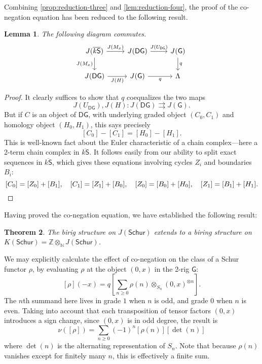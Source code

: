 \documentclass[12pt,reqno]{amsart}
\theoremstyle{plain}
\newtheorem{thm}{Theorem}
\newtheorem{lem}[thm]{Lemma}
\theoremstyle{definition}
\theoremstyle{remark}
\newcommand{\maps}{\colon}
\newcommand{\category}[1]{\mathsf{#1}}
\newcommand{\N}{\mathbb N}
\renewcommand{\S}{\category S}
\newcommand{\Z}{\mathbb Z}
\newcommand{\namedcat}[1]{\mathsf{#1}}
\newcommand{\Schur}{\namedcat{Schur}}
\newcommand{\G}{\mathsf{G}} %
\newcommand{\DG}{\mathsf{DG}} %
\newcommand{\ksbar}{\overline{k\S}}
\numberwithin{thm}{section}
\begin{document}
Combining \cref{prop:reduction-three} and \cref{lem:reduction-four}, the proof of the co-negation equation has been reduced to the following result.

\begin{lem}
    The following diagram commutes. 
    \[
    \begin{tikzcd}
        J(\ksbar) 
        \arrow[swap, d, "J(M_x)"] 
        \arrow[r, "J(M_x)"] 
        &
        J(\DG) 
        \arrow[r, "J(U_{\DG})"] 
        & 
        J(\G) 
        \arrow[d, "q"] 
        \\
        J(\DG) 
        \arrow[r, swap, "J(H)"] 
        & 
        J(\G) 
        \arrow[r, swap, "q"] 
        & 
        \Lambda
    \end{tikzcd}
    \]
\end{lem}

\begin{proof}
    It clearly suffices to show that $q$ coequalizes the two maps 
    \[
    J(U_{\DG}), J(H) \maps J(\DG) \rightrightarrows J(\G).
    \]
    But if $C$ is an object of $\DG$, with underlying graded object $(C_0, C_1)$ and homology object $(H_0, H_1)$, this says precisely
    \[
    [C_0] - [C_1] = [H_0] - [H_1].
    \]
    This is well-known fact about the Euler characteristic of a chain complex---here a 2-term chain complex in $\ksbar$. It follows easily from our ability to split exact sequences in $\ksbar$, which gives these equations involving cycles $Z_i$ and boundaries $B_i$: 
    \[
    [C_0] = [Z_0] + [B_1], \quad [C_1] = [Z_1] + [B_0], \quad [Z_0] = [B_0] + [H_0], \quad 
    [Z_1] = [B_1] + [H_1]. \qedhere
    \]
\end{proof}

Having proved the co-negation equation, we have established the following result: 

\begin{thm}
\label{thm:lambda_biring}
The birig structure on $J(\Schur)$ extends to a biring structure on $K(\Schur) = \Z \otimes_\N J(\Schur)$. 
\end{thm}

We may explicitly calculate the effect of co-negation on the class of a Schur functor $\rho$, by evaluating $\rho$ at the object $(0, x)$ in the 2-rig $\G$:
\[
[\rho](-x) = q \left[\sum_{n \ge 0} \rho(n) \otimes_{S_n} (0, x)^{\otimes n}\right].
\]
The $n$th summand here lives in grade $1$ when $n$ is odd, and grade $0$ when $n$ is even. Taking into account that each transposition of tensor factors $(0, x)$ introduces a sign change, since $(0, x)$ is in odd degree, the result is 
\[
\nu([\rho]) = \sum_{n \ge 0} (-1)^n[\rho(n)][\det(n)]
\]
where $\det(n)$ is the alternating representation of $S_n$. Note that because $\rho(n)$ vanishes except for finitely many $n$, this is effectively a finite sum.
\end{document}
